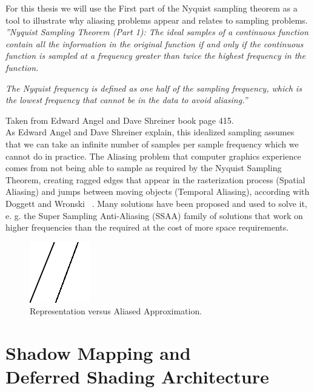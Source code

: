 \documentclass{cslthse-msc}
\begin{document}
For this thesis we will use  the First part of the Nyquist sampling theorem as a tool to illustrate why aliasing problems appear and relates to sampling problems. \\

\emph{''Nyquist Sampling Theorem (Part 1): The ideal samples of a continuous function contain all the information in the original function if and only if the continuous function is sampled at a frequency greater than twice the highest frequency in the function.}

\emph{The Nyquist frequency is defined as one half of the sampling frequency, which is the lowest frequency that cannot be in the data to avoid aliasing.''
}

Taken from Edward Angel and Dave Shreiner book page 415. \cite{Shreiner2011} \\

As Edward Angel and Dave Shreiner explain, this idealized sampling assumes that we can take an infinite number of samples per sample frequency which we cannot do in practice. The Aliasing problem that computer graphics experience comes from not being able to sample as required by the Nyquist Sampling Theorem, creating ragged edges that appear in the rasterization process (Spatial Aliasing) and jumps between moving objects (Temporal Aliasing), according with Doggett and Wronski  ~\cite{Doggett2017EDAN35,Wronski2014}. Many solutions have been proposed and used to solve it, e. g. the Super Sampling Anti-Aliasing (SSAA) family of solutions that work on higher frequencies than the required at the cost of more space requirements. 

\begin{figure}[!hbt]
	\centering
	\includegraphics[scale=1.0]{images/aliasing_example.png} 
	\caption{Representation versus Aliased Approximation.}\label{fig:aliasingexample}
\end{figure}

\section{Shadow Mapping and \\ Deferred Shading Architecture}
\end{document}
